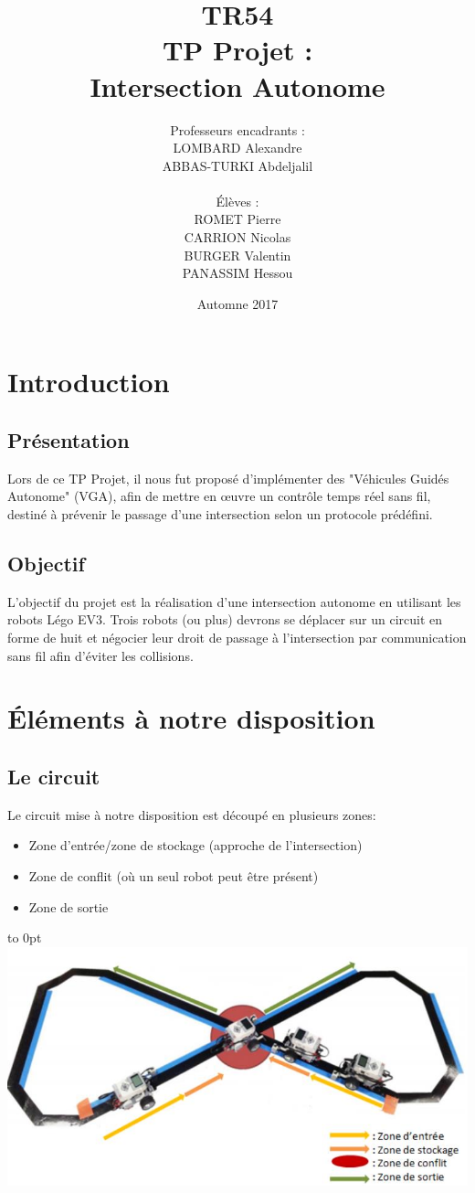 \documentclass[french,a4paper,12pt]{report}
\title{TR54 \\ TP Projet :\\ Intersection Autonome}
\author{Professeurs encadrants :\\LOMBARD Alexandre \\ ABBAS-TURKI Abdeljalil\\\\ Élèves :\\ROMET Pierre\\CARRION Nicolas\\BURGER Valentin\\PANASSIM Hessou}
\date{Automne 2017}
\begin{document}
\maketitle

\tableofcontents

\part{Introduction}

\chapter{Présentation}
Lors de ce TP Projet,
il nous fut proposé d'implémenter des "Véhicules Guidés Autonome" (VGA), afin de mettre en œuvre un contrôle
temps réel sans fil, destiné à prévenir le passage d'une intersection selon un protocole prédéfini.

\chapter{Objectif}
L'objectif du projet est la réalisation d'une intersection autonome en utilisant les robots Légo EV3.
Trois robots (ou plus) devrons se déplacer sur un circuit en forme de huit et négocier leur droit de passage à
l'intersection par communication sans fil afin d'éviter les collisions.

\part{Éléments à notre disposition}

\chapter{Le circuit}
Le circuit mise à notre disposition est découpé en plusieurs zones:
\begin{itemize}
\item Zone d’entrée/zone de stockage (approche de l’intersection)
\item Zone de conflit (où un seul robot peut être présent)
\item Zone de sortie
\end{itemize}

\hfill\hbox to 0pt{\hss\includegraphics[width=15cm]{circuit.png}\hss}\hfill\null\newline
\end{document}
